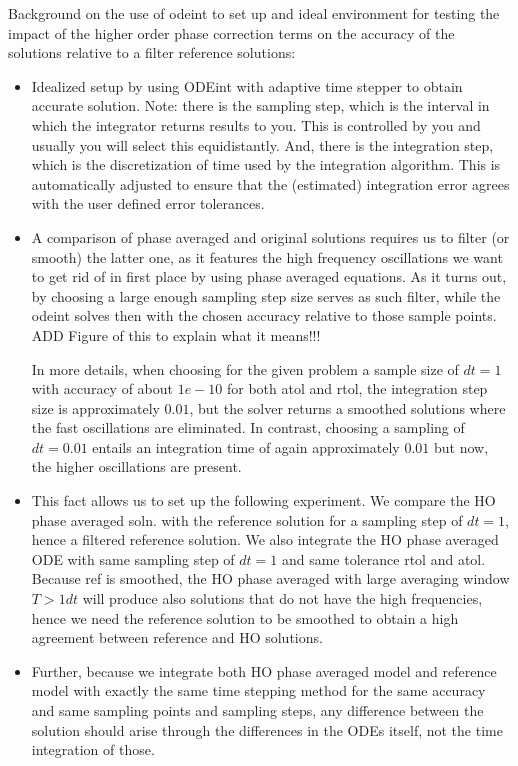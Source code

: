 \documentclass[a4,12pt]{article}
\newcommand{\checkit}[1]{{\color{red}#1}}
\begin{document}
Background on the use of odeint to set up and ideal environment for testing the impact of the higher order phase correction terms on the accuracy of the solutions relative to a filter reference solutions:
\begin{itemize}
 \item Idealized setup by using ODEint with adaptive time stepper to obtain accurate solution. Note: there is the sampling step, which is the interval in which the integrator returns results to you. This is controlled by you and usually you will select this equidistantly. And, there is the integration step, which is the discretization of time used by the integration algorithm. This is automatically adjusted to ensure that the (estimated) integration error agrees with the user defined error tolerances.

\item A comparison of phase averaged and original solutions requires us to filter (or smooth) the latter one, as it features the high frequency oscillations we want to get rid of in first place by using phase averaged equations. As it turns out, by choosing a large enough sampling step size serves as such filter, while the odeint solves then with the chosen accuracy relative to those sample points. \checkit{ADD Figure of this to explain what it means!!!}

In more details, when choosing for the given problem a sample size of $dt = 1$ with accuracy of about $1e-10$ for both atol and rtol, the integration step size is approximately $0.01$, but the solver returns a smoothed solutions where the fast oscillations are eliminated. In contrast, choosing a sampling of $dt = 0.01$ entails an integration time of again approximately $0.01$ but now, the higher oscillations are present.

\item This fact allows us to set up the following experiment. We compare the HO phase averaged soln. with the reference solution for a sampling step of $dt = 1$, hence a filtered reference solution. We also integrate the HO phase averaged ODE with same sampling step of $dt =1$ and same tolerance rtol and atol. Because ref is smoothed, the HO phase averaged with large averaging window $T>1dt$ will produce also solutions that do not have the high frequencies, hence we need the reference solution to be smoothed to obtain a high agreement between reference and HO solutions.

\item Further, because we integrate both HO phase averaged model and reference model with exactly the same time stepping method for the same accuracy and same sampling points and sampling steps, any difference between the solution should arise through the differences in the ODEs itself, not the time integration of those.


\end{itemize}
\end{document}
